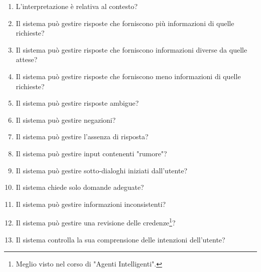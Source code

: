 \begin{enumerate}
  \item L'interpretazione è relativa al contesto?
  \item Il sistema può gestire risposte che forniscono più informazioni di quelle richieste?
  \item Il sistema può gestire risposte che forniscono informazioni diverse da quelle attese?
  \item Il sistema può gestire risposte che forniscono meno informazioni di quelle richieste? 
  \item Il sistema può gestire risposte ambigue? 
  \item Il sistema può gestire negazioni? 
  \item Il sistema può gestire l'assenza di risposta? 
  \item Il sistema può gestire input contenenti "rumore"? 
  \item Il sistema può gestire sotto-dialoghi iniziati dall'utente? 
  \item Il sistema chiede solo domande adeguate? 
  \item Il sistema può gestire informazioni inconsistenti? 
  \item Il sistema può gestire una revisione delle credenze\footnote{Meglio visto nel corso di "Agenti Intelligenti".}? 
  \item Il sistema controlla la sua comprensione delle intenzioni dell'utente?
\end{enumerate}








